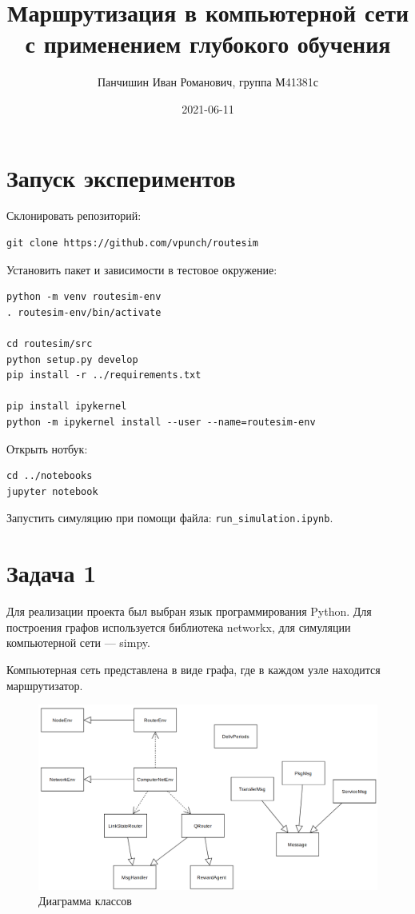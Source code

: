 \documentclass[a4paper]{article}
\title{Маршрутизация в компьютерной сети с применением глубокого обучения}
\author{Панчишин Иван Романович, группа М41381с}
\date{2021-06-11}
\begin{document}
\maketitle

\section{Запуск экспериментов}

Склонировать репозиторий:

\begin{verbatim}
git clone https://github.com/vpunch/routesim
\end{verbatim}

Установить пакет и зависимости в тестовое окружение:

\begin{verbatim}
python -m venv routesim-env
. routesim-env/bin/activate

cd routesim/src
python setup.py develop
pip install -r ../requirements.txt

pip install ipykernel
python -m ipykernel install --user --name=routesim-env
\end{verbatim}

Открыть нотбук:

\begin{verbatim}
cd ../notebooks
jupyter notebook
\end{verbatim}

Запустить симуляцию при помощи файла: \texttt{run\_simulation.ipynb}. 

\section{Задача 1}

Для реализации проекта был выбран язык программирования Python. Для построения
графов используется библиотека networkx, для симуляции компьютерной сети ---
simpy.

Компьютерная сеть представлена в виде графа, где в каждом узле находится
маршрутизатор.

\begin{figure}[H]
    \centering
    \includegraphics[width=\textwidth]{figs/classes}
    \caption{Диаграмма классов}\label{fig:cls}
\end{figure}
\end{document}
